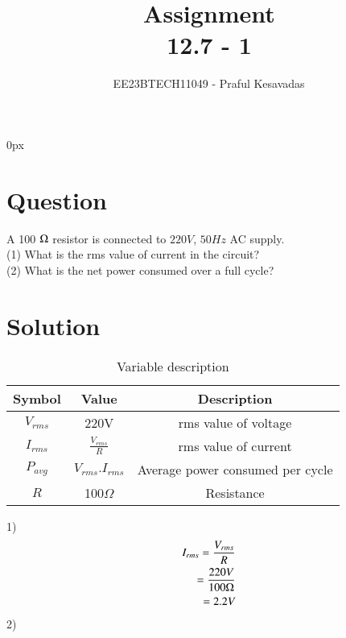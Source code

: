 \documentclass[journal,12pt,twocolumn]{IEEEtran}
\theoremstyle{remark}
\begin{document}
\parindent 0px


\title{Assignment\\[1ex]12.7 - 1}
\author{EE23BTECH11049 - Praful Kesavadas$^{}$%
}
\maketitle
\newpage
\bigskip

\renewcommand{\thefigure}{\theenumi}
\renewcommand{\thetable}{\theenumi}
\section*{Question}
A 100 $\ohm$ resistor is connected to $220 V$, $50 Hz$ AC supply.\\
(1) What is the rms value of current in the circuit?\\
(2) What is the net power consumed over a full cycle?

\section*{Solution}
\begin{table}[ht]
    \centering
    \begin{tabular}{|c|c|c|}
    \hline
   Symbol&Value&Description\\ \hline
   $V_{rms}$&220V&rms value of voltage\\ \hline
   $I_{rms}$&$\frac{V_{rms}}{R}$&rms value of current\\ \hline
   $P_{avg}$&$V_{rms} .I_{rms}$&Average power consumed per cycle\\ \hline
   $R$&100$\Omega$&Resistance \\\hline
    \end{tabular}
    \label{table:1}
    \caption{Variable description}
    
\end{table}
1)
\begin{align*}
I_{rms} = \frac{V_{rms}}{R}\\
  = \frac{220 V}{100 \ohm}\\
= 2.2 V
\end{align*}
2)



\end{document}
